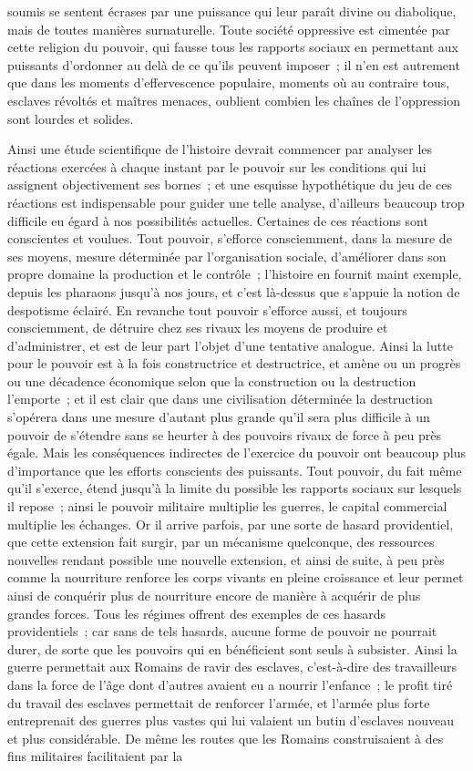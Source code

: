 \documentclass[french,twoside]{book} %
\begin{document}
soumis se sentent écrases par une puissance qui leur paraît divine ou diabolique, mais de toutes manières surnaturelle. Toute société oppressive est cimentée par cette religion du pouvoir, qui fausse tous les rapports sociaux en permettant aux puissants d'ordonner au delà de ce qu'ils peuvent imposer ; il n'en est autrement que dans les moments d'effervescence populaire, moments où au contraire tous, esclaves révoltés et maîtres menaces, oublient combien les chaînes de l'oppression sont lourdes et solides.\par
Ainsi une étude scientifique de l'histoire devrait commencer par analyser les réactions exercées à chaque instant par le pouvoir sur les conditions qui lui assignent objectivement ses bornes ; et une esquisse hypothétique du jeu de ces réactions est indispensable pour guider une telle analyse, d'ailleurs beaucoup trop difficile eu égard à nos possibilités actuelles. Certaines de ces réactions sont conscientes et voulues. Tout pouvoir, s'efforce consciemment, dans la mesure de ses moyens, mesure déterminée par l'organisation sociale, d'améliorer dans son propre domaine la production et le contrôle ; l'histoire en fournit maint exemple, depuis les pharaons jusqu'à nos jours, et c'est là-dessus que s'appuie la notion de despotisme éclairé. En revanche tout pouvoir s'efforce aussi, et toujours consciemment, de détruire chez ses rivaux les moyens de produire et d'administrer, et est de leur part l'objet d'une tentative analogue. Ainsi la lutte pour le pouvoir est à la fois constructrice et destructrice, et amène ou un progrès ou une décadence économique selon que la construction ou la destruction l'emporte ; et il est clair que dans une civilisation déterminée la destruction s'opérera dans une mesure d'autant plus grande qu'il sera plus difficile à un pouvoir de s'étendre sans se heurter à des pouvoirs rivaux de force à peu près égale. Mais les conséquences indirectes de l'exercice du pouvoir ont beaucoup plus d'importance que les efforts conscients des puissants. Tout pouvoir, du fait même qu'il s'exerce, étend jusqu'à la limite du possible les rapports sociaux sur lesquels il repose ; ainsi le pouvoir militaire multiplie les guerres, le capital commercial multiplie les échanges. Or il arrive parfois, par une sorte de hasard providentiel, que cette extension fait surgir, par un mécanisme quelconque, des ressources nouvelles rendant possible une nouvelle extension, et ainsi de suite, à peu près comme la nourriture renforce les corps vivants en pleine croissance et leur permet ainsi de conquérir plus de nourriture encore de manière à acquérir de plus grandes forces. Tous les régimes offrent des exemples de ces hasards providentiels ; car sans de tels hasards, aucune forme de pouvoir ne pourrait durer, de sorte que les pouvoirs qui en bénéficient sont seuls à subsister. Ainsi la guerre permettait aux Romains de ravir des esclaves, c'est-à-dire des travailleurs dans la force de l'âge dont d'autres avaient eu a nourrir l'enfance ; le profit tiré du travail des esclaves permettait de renforcer l'armée, et l'armée plus forte entreprenait des guerres plus vastes qui lui valaient un butin d'esclaves nouveau et plus considérable. De même les routes que les Romains construisaient à des fins militaires facilitaient par la 
\end{document}
